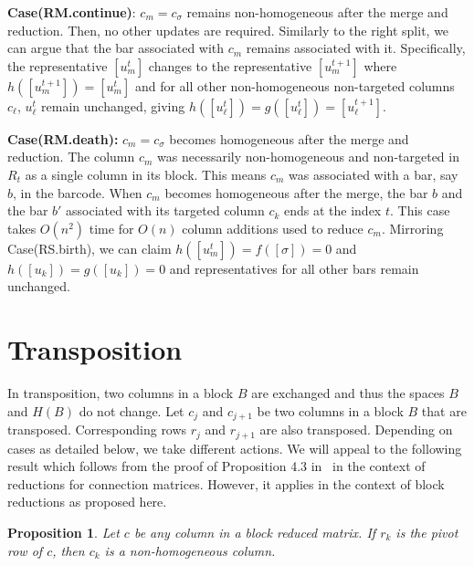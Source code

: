 \documentclass[letterpaper,11pt]{article}
\theoremstyle{plain}
\newtheorem{proposition}[theorem]{Proposition}
\theoremstyle{definition}
\newcounter{li}
\begin{document}
\textbf{Case(RM.continue)}: $c_m=c_\sigma$ remains non-homogeneous after the merge and reduction. 
Then, no other updates are required.
Similarly to the right split, we can argue that the bar associated with $c_m$ 
remains associated with it. Specifically, the representative
$[u^t_m]$ changes to the representative $[u^{t+1}_m]$ where $h([u^{t+1}_m])=[u^t_m]$ and
for all other non-homogeneous non-targeted columns $c_\ell$, $u^t_\ell$ remain
unchanged, giving $h([u^t_\ell])=g([u^t_\ell])=[u^{t+1}_\ell]$.

\textbf{Case(RM.death):} $c_m=c_\sigma$ becomes homogeneous after the merge and reduction. 
The column
$c_m$ was necessarily non-homogeneous and non-targeted in $R_t$ as a single column 
in its block.
This means $c_m$ was associated with a bar, say $b$, in the barcode. When $c_m$ becomes homogeneous after the merge, the bar $b$ and the bar $b'$ associated with its targeted column $c_k$ ends at the index $t$. This case takes $O(n^2)$ time for $O(n)$
column additions used to reduce $c_m$. Mirroring Case(RS.birth), we 
can claim $h([u^t_m])=f([\sigma])=0$ and $h([u_k])=g([u_k])=0$ and representatives
for all other bars remain unchanged.
\section{Transposition}
\label{sec:transpose-shuffle}
In transposition, two columns in a block $B$ are exchanged and thus the spaces $B$ and
$H(B)$ do not change.
Let $c_j$ and $c_{j+1}$ be two columns in a block $B$ that are transposed. Corresponding
rows $r_j$ and $r_{j+1}$ are also transposed. Depending on cases as detailed below, we take different actions. We will appeal to the following result which follows from the proof of Proposition 4.3 in~\cite{DeHaLi2025}
in the context of reductions for connection matrices. However, it
applies in the context of block reductions as proposed here.

\begin{proposition}
    Let $c$ be any column in a block reduced matrix. If $r_k$ is the pivot row
    of $c$, then $c_k$ is a non-homogeneous column.
    \label{prop:pivot-hom}
\end{proposition}
\end{document}
